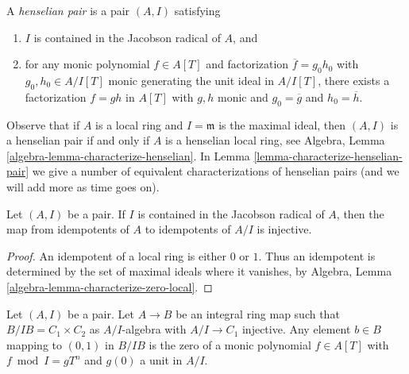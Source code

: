 \begin{definition}
\label{definition-henselian-pair}
A {\it henselian pair} is a pair $(A, I)$ satisfying
\begin{enumerate}
\item $I$ is contained in the Jacobson radical of $A$, and
\item for any monic polynomial $f \in A[T]$ and factorization
$\overline{f} = g_0h_0$ with $g_0, h_0 \in A/I[T]$ monic
generating the unit ideal in $A/I[T]$, there
exists a factorization $f = gh$ in $A[T]$ with $g, h$ monic
and $g_0 = \overline{g}$ and $h_0 = \overline{h}$.
\end{enumerate}
\end{definition}

\noindent
Observe that if $A$ is a local ring and $I = \mathfrak m$ is the maximal
ideal, then $(A, I)$ is a henselian pair if and only if $A$ is a henselian
local ring, see
Algebra, Lemma \ref{algebra-lemma-characterize-henselian}.
In Lemma \ref{lemma-characterize-henselian-pair} we give a number of
equivalent characterizations of
henselian pairs (and we will add more as time goes on).

\begin{lemma}
\label{lemma-idempotents-determined-modulo-radical}
Let $(A, I)$ be a pair. If $I$ is contained in the Jacobson radical
of $A$, then the map from idempotents of $A$ to idempotents of
$A/I$ is injective.
\end{lemma}

\begin{proof}
An idempotent of a local ring is either $0$ or $1$.
Thus an idempotent is determined by the set of maximal ideals
where it vanishes, by
Algebra, Lemma \ref{algebra-lemma-characterize-zero-local}.
\end{proof}

\begin{lemma}
\label{lemma-helper-integral}
Let $(A, I)$ be a pair. Let $A \to B$ be an integral ring map
such that $B/IB = C_1 \times C_2$ as $A/I$-algebra with $A/I \to C_1$
injective. Any element $b \in B$ mapping to $(0, 1)$ in $B/IB$
is the zero of a monic polynomial $f \in A[T]$
with $f \bmod I = g T^n$ and $g(0)$ a unit in $A/I$.
\end{lemma}

